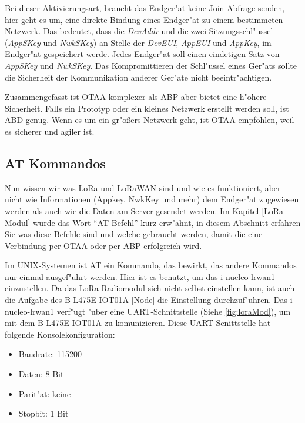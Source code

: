 Bei dieser Aktivierungsart, braucht das Endger"at keine Join-Abfrage 
senden, hier geht es um, eine direkte Bindung eines Endger"at zu einem 
bestimmeten Netzwerk. Das bedeutet, dass die \textit{DevAddr} und die 
zwei Sitzungsschl"ussel (\textit{AppSKey} und \textit{NwkSKey}) an 
Stelle der \textit{DevEUI}, \textit{AppEUI} und \textit{AppKey}, im 
Endger"at gespeichert werde. Jedes Endger"at soll einen eindetigen Satz 
von \textit{AppSKey} und \textit{NwkSKey}. Das Kompromittieren der 
Schl"ussel eines Ger"ats sollte die Sicherheit der Kommunikation anderer 
Ger"ate nicht beeintr"achtigen. 


Zusammengefasst ist OTAA komplexer als ABP aber bietet eine h"ohere 
Sicherheit. Falls ein Prototyp oder ein kleines Netzwerk erstellt werden 
soll, ist ABD genug. Wenn es um ein gr"o\ss{}ers Netzwerk geht, ist OTAA 
empfohlen, weil es sicherer und agiler ist. 

\vspace{5cm}
\subsection{AT Kommandos}\label{AT}

Nun wissen wir was LoRa und LoRaWAN sind und wie es funktioniert, aber 
nicht wie Informationen (Appkey, NwkKey und mehr) dem Endger"at 
zugewiesen werden als auch wie die Daten am Server gesendet werden. 
Im Kapitel \ref{LoRa Modul} wurde das Wort ``AT-Befehl'' kurz erw"ahnt, 
in diesem Abschnitt erfahren Sie was diese Befehle sind und welche 
gebraucht werden, damit die eine Verbindung per OTAA oder per ABP 
erfolgreich wird.

Im UNIX-Systemen ist AT ein Kommando, das bewirkt, das andere Kommandos
nur einmal ausgef"uhrt werden. Hier ist es benutzt, um das
i-nucleo-lrwan1 einzustellen. Da das LoRa-Radiomodul sich nicht selbst
einstellen kann, ist auch die Aufgabe des B-L475E-IOT01A \ref{Node} die 
Einstellung durchzuf"uhren. Das i-nucleo-lrwan1 verf"ugt "uber eine 
UART-Schnittstelle (Siehe \ref{fig:loraMod}), um mit dem B-L475E-IOT01A 
zu komunizieren. Diese UART-Scnittstelle hat folgende 
Konsolekonfiguration: 

\begin{itemize}
	\item Baudrate: 115200
	\item Daten: 8 Bit
	\item Parit"at: keine
	\item Stopbit: 1 Bit
\end{itemize}           

